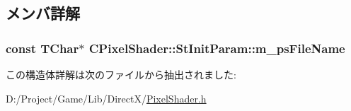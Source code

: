 \subsection{メンバ詳解}
\hypertarget{struct_c_pixel_shader_1_1_st_init_param_a669e9cb36ba12bd9590eb148cd02d6df}{}
\subsubsection[{m\+\_\+ps\+File\+Name}]{\setlength{\rightskip}{0pt plus 5cm}const T\+Char$\ast$ C\+Pixel\+Shader\+::\+St\+Init\+Param\+::m\+\_\+ps\+File\+Name}\label{struct_c_pixel_shader_1_1_st_init_param_a669e9cb36ba12bd9590eb148cd02d6df}


この構造体詳解は次のファイルから抽出されました\+:\begin{DoxyCompactItemize}
\item 
D\+:/\+Project/\+Game/\+Lib/\+Direct\+X/\hyperlink{_pixel_shader_8h}{Pixel\+Shader.\+h}\end{DoxyCompactItemize}
